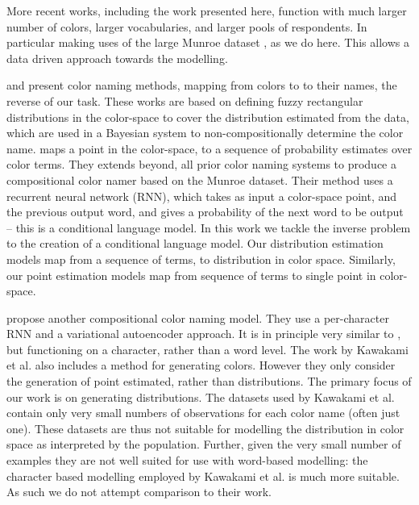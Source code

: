 \documentclass[11pt,a4paper]{article}
\newcommand{\textcite}{\citet}
\begin{document}
More recent works, including the work presented here, function with much larger number of colors, larger vocabularies, and larger pools of respondents.
In particular making uses of the large Munroe dataset \textcite{Munroe2010XKCDdataset}, as we do here.
This allows a data driven approach towards the modelling.

\textcite{mcmahan2015bayesian} and \textcite{meomcmahanstone:color} present color naming methods, mapping from colors to to their names, the reverse of our task.
These works are based on defining fuzzy rectangular distributions in the color-space to cover the distribution estimated from the data, which are used in a Bayesian system to non-compositionally determine the color name.
%
%
\textcite{2016arXiv160603821M} maps a point in the color-space, to a sequence of probability estimates over color terms.
They extends beyond, all prior color naming systems to produce a compositional color namer based on the Munroe dataset.
Their method uses a recurrent neural network (RNN), which takes as input a color-space point, and the previous output word, and gives a probability of the next word to be output -- this is a conditional language model.
In this work we tackle the inverse problem to the creation of a conditional language model.
Our distribution estimation models map from a sequence of terms, to distribution in color space.
Similarly, our point estimation models map from sequence of terms to single point in color-space.



\textcite{DBLP:journals/corr/KawakamiDRS16} propose another compositional color naming model.
They use a per-character RNN and a variational autoencoder approach.
It is in principle very similar to \textcite{2016arXiv160603821M}, but functioning on a character, rather than a word level.
The work by Kawakami et al. also includes a method for generating colors.
However they only consider the generation of point estimated, rather than distributions.
The primary focus of our work is on generating distributions.
The datasets used by Kawakami et al. contain only very small numbers of observations for each color name (often just one).
These datasets are thus not suitable for modelling the distribution in color space as interpreted by the population.
Further, given the very small number of examples they are not well suited for use with word-based modelling: the character based modelling employed by Kawakami et al. is much more suitable.
As such we do not attempt comparison to their work.
\end{document}
